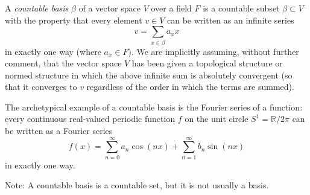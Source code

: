 \documentclass{article}
\begin{document}
A {\em countable basis} $\beta$ of a vector space $V$ over a field $F$ is a countable subset $\beta \subset V$ with the property that every element $v \in V$ can be written as an infinite series
$$
v = \sum_{x \in \beta} a_x x
$$
in exactly one way (where $a_x \in F$). We are implicitly assuming, without further comment, that the vector space $V$ has been given a topological structure or normed structure in which the above infinite sum is absolutely convergent (so that it converges to $v$ regardless of the order in which the terms are summed).

The archetypical example of a countable basis is the Fourier series of a function: every continuous real-valued periodic function $f$ on the unit circle $S^1 = \mathbb{R}/2\pi$ can be written as a Fourier series
$$
f(x) = \sum_{n=0}^\infty a_n \cos(n x) + \sum_{n=1}^\infty b_n \sin(n x)
$$
in exactly one way.

Note: A countable basis is a countable set, but it is not usually a basis.
\end{document}
